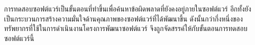 การทดสอบซอฟต์แวร์เป็นขั้นตอนที่ทำขึ้นเพื่อค้นหาข้อผิดพลาดที่ยังคงอยู่ภายในซอฟต์แวร์ \cite{Myers:2011:AST:983238} 
อีกทั้งยังเป็นกระบวนการสร้างความมั่นใจด้านคุณภาพของซอฟต์แวร์ที่ได้พัฒนาขึ้น ดังนั้นกว่ากึ่งหนึ่งของทรัพยากรที่ใช้ในการดำเนินงานโครงการพัฒนาซอฟต์แวร์
จึงถูกจัดสรรค์ให้กับขั้นตอนการทดสอบซอฟต์แวร์นี้ \cite{Jackson2007, Tassey2002} 
